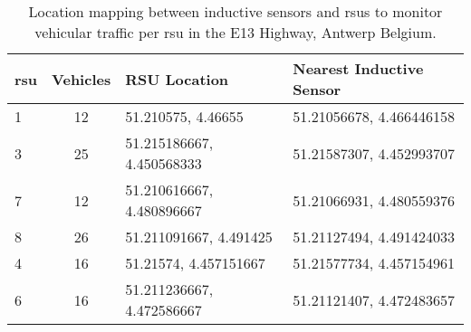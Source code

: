 \begin{table}[!t]
    \centering
    \caption{Location mapping between inductive sensors and \glspl{rsu} to monitor vehicular traffic per \gls{rsu} in the E13 Highway, Antwerp Belgium.}
    \label{tab:location-mapping-rsu}
    \begin{adjustbox}{max width=\columnwidth}
        \begin{tabular}{|l|c|l|l|}
            \hline
            \textbf{\gls{rsu}} & \textbf{Vehicles} & \textbf{RSU Location} & \textbf{Nearest Inductive Sensor} \\
            \hline
            1 & 12 & 51.210575, 4.46655        & 51.21056678, 4.466446158 \\
            3 & 25 & 51.215186667, 4.450568333 & 51.21587307, 4.452993707 \\
            7 & 12 & 51.210616667, 4.480896667 & 51.21066931, 4.480559376 \\
            8 & 26 & 51.211091667, 4.491425    & 51.21127494, 4.491424033 \\
            4 & 16 & 51.21574, 4.457151667     & 51.21577734, 4.457154961 \\
            6 & 16 & 51.211236667, 4.472586667 & 51.21121407, 4.472483657 \\
            \hline
        \end{tabular}
    \end{adjustbox}
\end{table}
